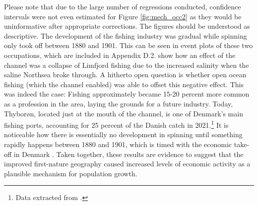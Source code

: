 \documentclass[11pt]{article}
\begin{document}
Please note that due to the large number of regressions conducted, confidence intervals were not even estimated for Figure \ref{fig:mech_occ2} as they would be uninformative after appropriate corrections. The figures should be understood as descriptive. The development of the fishing industry was gradual while spinning only took off between 1880 and 1901. This can be seen in event plots of these two occupations, which are included in Appendix D.2. \cite{Poulsen2007} show how an effect of the channel was a collapse of Limfjord fishing due to the increased salinity when the saline Northsea broke through. A hitherto open question is whether open ocean fishing (which the channel enabled) was able to offset this negative effect. This was indeed the case: Fishing approximately became 15-20 percent more common as a profession in the area, laying the grounds for a future industry. Today, Thyborøn, located just at the mouth of the channel, is one of Denmark's main fishing ports, accounting for 25 percent of the Danish catch in 2021.\footnote{Data extracted from \cite{MinisterietforFodevarer2022}.} It is noticeable how there is essentially no development in spinning until something rapidly happens between 1880 and 1901, which is timed with the economic take-off in Denmark \citep{Khaustova2015}. Taken together, these results are evidence to suggest that the improved first-nature geography caused increased levels of economic activity as a plausible mechanism for population growth. 
\end{document}
